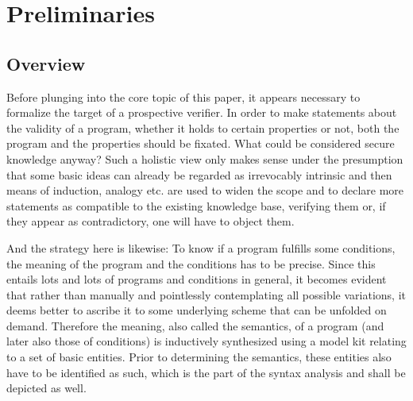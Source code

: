 %
%

\chapter{Preliminaries}

\section{Overview}

Before plunging into the core topic of this paper, it appears necessary to formalize the target of a prospective verifier. In order to make statements about the validity of a program, whether it holds to certain properties or not, both the program and the properties should be fixated. What could be considered secure knowledge anyway? Such a holistic view only makes sense under the presumption that some basic ideas can already be regarded as irrevocably intrinsic and then means of induction, analogy etc. are used to widen the scope and to declare more statements as compatible to the existing knowledge base, verifying them or, if they appear as contradictory, one will have to object them.

And the strategy here is likewise: To know if a program fulfills some conditions, the meaning of the program and the conditions has to be precise. Since this entails lots and lots of programs and conditions in general, it becomes evident that rather than manually and pointlessly contemplating all possible variations, it deems better to ascribe it to some underlying scheme that can be unfolded on demand. Therefore the meaning, also called the semantics, of a program (and later also those of conditions) is inductively synthesized using a model kit relating to a set of basic entities. Prior to determining the semantics, these entities also have to be identified as such, which is the part of the syntax analysis and shall be depicted as well.

